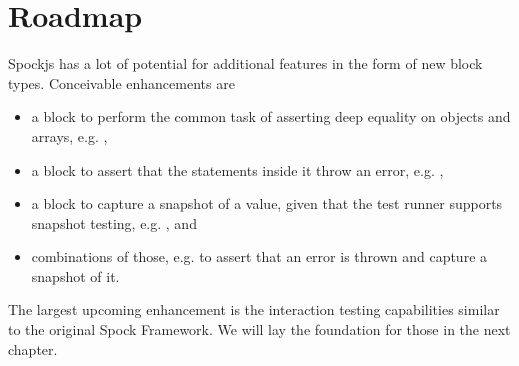 \section{Roadmap}
Spockjs has a lot of potential for additional features in the form of new block types.
Conceivable enhancements are
\begin{itemize}
  \item a block to perform the common task of asserting deep equality on objects and arrays,
    e.g. ,
  \item a block to assert that the statements inside it throw an error,
    e.g. ,
  \item a block to capture a snapshot of a value, given that the test runner supports snapshot testing,
    e.g. , and
  \item combinations of those,
    e.g.  to assert that an error is thrown and capture a snapshot of it.
\end{itemize}

The largest upcoming enhancement is the interaction testing capabilities
similar to the original Spock Framework.
We will lay the foundation for those in the next chapter.

